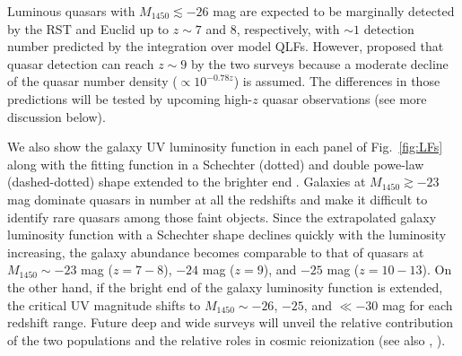 \documentclass[twocolumn, twocolappendix]{aastex63}
\newcommand{\Muv}{M_{1450}}
\begin{document}
\begin{CJK*}{UTF8}{gbsn}
Luminous quasars with $\Muv \lesssim -26$ mag are expected to be marginally detected by the RST and Euclid up to $z\sim 7$ and 8, respectively,
with $\sim 1$ detection number predicted by the integration over model QLFs.
However, \citet{2019BAAS...51c.121F} proposed that quasar detection can reach $z\sim 9$ by the two surveys
because a moderate decline of the quasar number density ($\propto 10^{-0.78z}$) is assumed.
The differences in those predictions will be tested by upcoming high-$z$ quasar observations (see more discussion below).



We also show the galaxy UV luminosity function in each panel of Fig.~\ref{fig:LFs}
along with the fitting function in a Schechter (dotted) and double powe-law (dashed-dotted) shape extended to the brighter end
\citep{2013MNRAS.432.2696M, 2016ApJ...819..129O, 2018ApJ...867..150M, 2019ApJ...883...99S, 2020MNRAS.493.2059B,
2021AJ....162...47B, 2022arXiv220712356D,
2022ApJS..259...20H, Harikane_2022b, Harikane_2022c, 2022arXiv220709434N}.
Galaxies at $\Muv\gtrsim -23$ mag dominate quasars in number at all the redshifts and make it 
difficult to identify rare quasars among those faint objects.
Since the extrapolated galaxy luminosity function with a Schechter shape declines quickly with the luminosity increasing,
the galaxy abundance becomes comparable to that of quasars at $\Muv \sim -23$ mag ($z=7-8$), $-24$ mag ($z=9$), and $-25$ mag ($z=10-13$).
On the other hand, if the bright end of the galaxy luminosity function is extended, the critical UV magnitude shifts to
$\Muv\sim-26$, $-25$, and $\ll -30$ mag for each redshift range.
Future deep and wide surveys will unveil the relative contribution of the two populations and the relative roles in cosmic reionization
(see also , \citealt{2022NatAs...6..850J}).




\end{CJK*}
\end{document}
